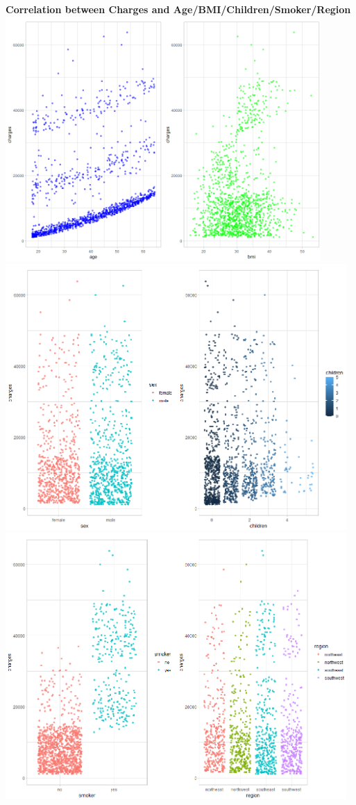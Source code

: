 \documentclass[a4paper]{article}
\begin{document}
\begin{center}
    \textbf{Correlation between Charges and Age/BMI/Children/Smoker/Region} \\
    \includegraphics[width=12cm]{img/plot1.png} \\
    \includegraphics[width=13cm]{img/plot2.png} \\
    \includegraphics[width=13cm]{img/plot3.png}
\end{center}
\end{document}
